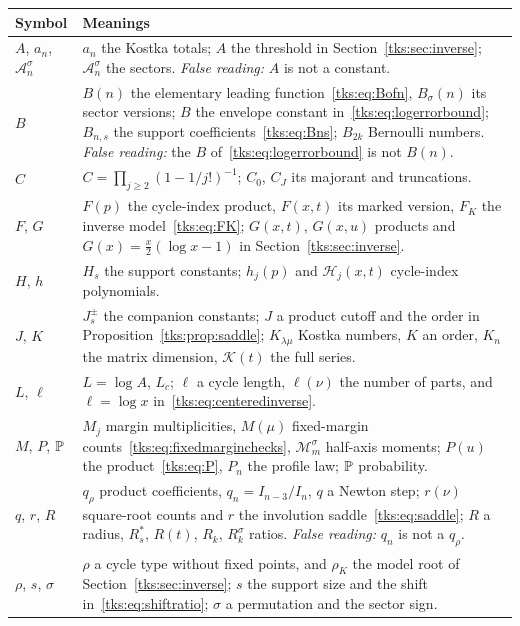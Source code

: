 \noindent\begin{longtable}{@{}>{\raggedright\arraybackslash}p{0.95in}>{\raggedright\arraybackslash}p{5.3in}@{}}
\toprule
Symbol & Meanings\\
\midrule
$A$, $a_n$, $\mathcal A_n^\sigma$ & $a_n$ the Kostka totals; $A$ the threshold in Section~\ref{tks:sec:inverse}; $\mathcal A_n^\sigma$ the sectors. \emph{False reading:} $A$ is not a constant.\\
$B$ & $B(n)$ the elementary leading function~\eqref{tks:eq:Bofn}, $B_\sigma(n)$ its sector versions; $B$ the envelope constant in~\eqref{tks:eq:logerrorbound}; $B_{n,s}$ the support coefficients~\eqref{tks:eq:Bns}; $B_{2k}$ Bernoulli numbers. \emph{False reading:} the $B$ of~\eqref{tks:eq:logerrorbound} is not $B(n)$.\\
$C$ & $C=\prod_{j\ge2}(1-1/j!)^{-1}$; $C_0$, $C_J$ its majorant and truncations.\\
$F$, $G$ & $F(p)$ the cycle-index product, $F(x,t)$ its marked version, $F_K$ the inverse model~\eqref{tks:eq:FK}; $G(x,t)$, $G(x,u)$ products and $G(x)=\frac x2(\log x-1)$ in Section~\ref{tks:sec:inverse}.\\
$H$, $h$ & $H_s$ the support constants; $h_j(p)$ and $\mathcal H_j(x,t)$ cycle-index polynomials.\\
$J$, $K$ & $J_s^\pm$ the companion constants; $J$ a product cutoff and the order in Proposition~\ref{tks:prop:saddle}; $K_{\lambda\mu}$ Kostka numbers, $K$ an order, $K_n$ the matrix dimension, $\mathcal K(t)$ the full series.\\
$L$, $\ell$ & $L=\log A$, $L_c$; $\ell$ a cycle length, $\ell(\nu)$ the number of parts, and $\ell=\log x$ in~\eqref{tks:eq:centeredinverse}.\\
$M$, $P$, $\mathbb P$ & $M_j$ margin multiplicities, $M(\mu)$ fixed-margin counts~\eqref{tks:eq:fixedmarginchecks}, $\mathcal M_m^\sigma$ half-axis moments; $P(u)$ the product~\eqref{tks:eq:P}, $P_n$ the profile law; $\mathbb P$ probability.\\
$q$, $r$, $R$ & $q_\rho$ product coefficients, $q_n=I_{n-3}/I_n$, $q$ a Newton step; $r(\nu)$ square-root counts and $r$ the involution saddle~\eqref{tks:eq:saddle}; $R$ a radius, $R_s^*$, $R(t)$, $R_k$, $R_k^\sigma$ ratios. \emph{False reading:} $q_n$ is not a $q_\rho$.\\
$\rho$, $s$, $\sigma$ & $\rho$ a cycle type without fixed points, and $\rho_K$ the model root of Section~\ref{tks:sec:inverse}; $s$ the support size and the shift in~\eqref{tks:eq:shiftratio}; $\sigma$ a permutation and the sector sign.\\

\end{longtable}
